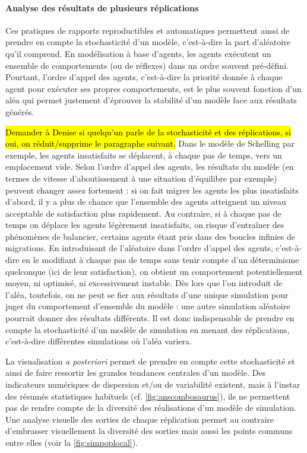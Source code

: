\documentclass[a4paper, 12pt]{article}
\begin{document}
\paragraph{Analyse des résultats de plusieurs réplications\label{par:analyse-replications}}

Ces pratiques de rapports reproductibles et automatiques permettent aussi de prendre en compte la stochasticité d'un modèle, c'est-à-dire la part d'aléatoire qu'il comprend.
En modélisation à base d'agents, les agents exécutent un ensemble de comportements (ou de \og réflexes\fg{}) dans un ordre souvent pré-défini.
Pourtant, l'ordre d'appel des agents, c'est-à-dire la priorité donnée à chaque agent pour exécuter ses propres comportements, est le plus souvent fonction d'un aléa qui permet justement d'éprouver la stabilité d'un modèle face aux résultats générés.


\hl{Demander à Denise si quelqu'un parle de la stochasticité et des réplications, si oui, on réduit/supprime le paragraphe suivant.}
Dans le modèle de Schelling \autocite{schelling_dynamic_1971} par exemple, les agents insatisfaits se déplacent, à chaque pas de temps, vers un emplacement vide.
Selon l'ordre d'appel des agents, les résultats du modèle (en termes de vitesse d'aboutissement à une situation d'équilibre par exemple) peuvent changer assez fortement :
si on fait migrer les agents les plus insatisfaits d'abord, il y a plus de chance que l'ensemble des agents atteignent un niveau acceptable de satisfaction plus rapidement.
Au contraire, si à chaque pas de temps on déplace les agents légèrement insatisfaits, on risque d'entraîner des phénomènes de balancier, certains agents étant pris dans des boucles infinies de migrations.
En introduisant de l'aléatoire dans l'ordre d'appel des agents, c'est-à-dire en le modifiant à chaque pas de temps sans tenir compte d'un déterminisme quelconque (ici de leur satisfaction), on obtient un comportement potentiellement moyen, ni optimisé, ni excessivement instable.
Dès lors que l'on introduit de l'aléa, toutefois, on ne peut se fier aux résultats d'une unique simulation pour juger du comportement d'ensemble du modèle :
une autre simulation aléatoire pourrait donner des résultats différents.
Il est donc indispensable de prendre en compte la stochasticité d'un modèle de simulation en menant des \og réplications\fg{}, c'est-à-dire différentes simulations où l'aléa variera.


La visualisation \textit{a posteriori} permet de prendre en compte cette stochasticité et ainsi de faire ressortir les grandes tendances centrales d'un modèle.
Des indicateurs numériques de dispersion et/ou de variabilité existent, mais à l'instar des résumés statistiques habituels (cf. \cref{fig:anscombosaurus}), ils ne permettent pas de rendre compte de la diversité des réalisations d'un modèle de simulation.
Une analyse visuelle des sorties de chaque réplication permet au contraire d'embrasser visuellement la diversité des sorties mais aussi les points communs entre elles (voir la \cref{fig:simpoplocal}).
\end{document}
